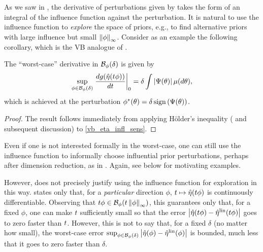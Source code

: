 As we saw in , the derivative of perturbations given
by  takes the form of an integral of the influence
function against the perturbation.  It is natural to use the influence function
to {\em explore} the space of priors, e.g., to find alternative priors with
large influence but small $\left\Vert\phi\right\Vert_{\infty}$.  Consider as an example the
following corollary, which is the VB analogue of \citet[Result
11]{gustafson:1996:local}.


\begin{cor}
%
The ``worst-case'' derivative in $\mathcal{B}_\phi(\delta)$ is given by
%
\begin{align*}
%
\sup_{\phi \in \ball_\phi(\delta)}
    \fracat{d g(\etaopt(\t \phi))}{d \t}{0} =
        \delta \int \abs{\infl(\theta)} \mu(d\theta),
%
\end{align*}
%
which is achieved at the perturbation
$\phi^*(\theta) = \delta \, \mathrm{sign}\left(\Psi(\theta)\right)$.
%
\begin{proof}
%
The result follows immediately from applying H{\"o}lder's inequality
(\citet[Theorem 5.1.2]{dudley:2018:real} and subsequent discussion)
to \eqref{vb_eta_infl_sens}.
%
\end{proof}
%
\end{cor}


Even if one is not interested formally in the worst-case, one can still use the
influence function to informally choose influential prior perturbations, perhaps
after dimension reduction, as in .  Again, see
 below for motivating examples.

However,  does not precisely justify using the
influence function for exploration in this way.  
states only that, for a {\em particular} direction $\phi$, $t \mapsto
\hat\eta(t \phi)$ is continuously differentiable.  Observing that $t \phi \in
\mathcal{B}_\phi(t \left\Vert\phi\right\Vert_{\infty})$, this guarantees only that, for a fixed $\phi$,
one can make $t$ sufficiently small so that the error $\left|\hat\eta(t \phi) -
\hat\eta^{\mathrm{lin}}(t \phi)\right|$ goes to zero faster than $t$. However, this is not to say
that, for a fixed $\delta$ (no matter how small), the worst-case error
$\sup_{\phi \in \mathcal{B}_\phi(\delta)} \left|\hat\eta(\phi) - \hat\eta^{\mathrm{lin}}(\phi)\right|$ is
bounded, much less that it goes to zero faster than $\delta$.

